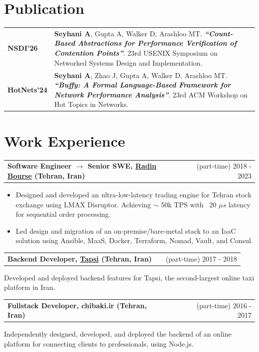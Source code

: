 \documentclass[a4paper,12pt]{article}
\makeatletter
\newcommand{\quotes}[1]{\textit{``#1''}}
\newenvironment{jobshort}[2]
{
    \begin{tabularx}{\linewidth}{@{}l X r@{}}
        \textbf{#1} & \hfill &  #2 \\[3.75pt]
    \end{tabularx}
    }
    {
}
\makeatother
\begin{document}
    \section{Publication}
    \begin{tabularx}{\linewidth}{@{}l X@{}}
        \textbf{NSDI'26} &  {
         \textbf{Seyhani A}, Gupta A, Walker D, Arashloo MT. \textbf{\quotes{Count-Based Abstractions for Performance Verification of Contention Points}}. 23rd USENIX Symposium on Networked Systems Design and Implementation.
        }
        \\
        \textbf{HotNets'24} &  {
        \textbf{Seyhani A}, Zhao J, Gupta A, Walker D, Arashloo MT.
        \textbf{\quotes{Buffy: A Formal Language-Based Framework for Network Performance Analysis}}. 23rd ACM Workshop on Hot Topics in Networks.
        }
        \\
    \end{tabularx}

    \section{Work Experience}
    \begin{jobshort}{Software Engineer $\rightarrow$ Senior SWE, \href{https://www.linkedin.com/company/radin-bourse/}{Radin Bourse} (Tehran, Iran)}{(part-time) 2018 - 2023}
        \vspace{-20pt}
        \begin{itemize}[leftmargin=*, nosep]
            \item  Designed and developed an ultra-low-latency trading engine for Tehran stock exchange using LMAX Disruptor. Achieving $\sim$ 50k TPS  with ~20 $\mu s$ latency for sequential order processing.
            \item  Led design and migration of an on-premise/bare-metal stack to an IaaC solution using Ansible, MaaS, Docker, Terraform, Nomad, Vault, and Consul.
        \end{itemize}
    \end{jobshort}

    \begin{jobshort}{Backend Developer, \href{https://tapsi.ir/en/}{Tapsi} (Tehran, Iran)}{(part-time) 2017 - 2018}
        Developed and deployed backend features for Tapsi, the second-largest online taxi platform in Iran.
    \end{jobshort}

    \begin{jobshort}{Fullstack Developer, chibaki.ir (Tehran, Iran)}{(part-time) 2016 - 2017}
        Independently designed, developed, and deployed the backend of an online platform for connecting clients to professionals, using Node.js.
    \end{jobshort}
\end{document}
